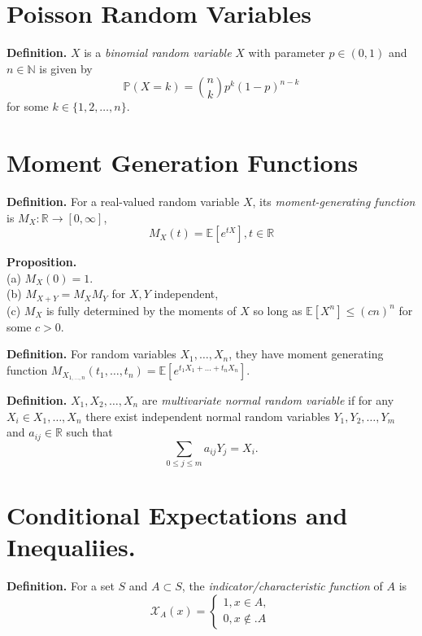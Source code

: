 \documentclass{article}[11pt]
\begin{document}
\section{Poisson Random Variables}

\textbf{Definition.} $X$ is a \emph{binomial random variable} $X$ with parameter $p \in (0,1)$ and $n \in \mathbb{N}$
is given by $$\mathbb{P}(X = k) = \binom{n}{k}p^k(1-p)^{n-k}$$ for some $k \in \{1,2,\dots, n\}.$
\section{Moment Generation Functions}

\textbf{Definition.} For a real-valued random variable $X$, its \emph{moment-generating function}
is $M_X: \mathbb{R}\to [0, \infty]$, $$M_X(t) = \mathbb{E}[e^{tX}], t \in \mathbb{R}$$

\par

\textbf{Proposition.} \\ 
(a) $M_X(0) = 1$. \\
(b) $M_{X+Y} = M_XM_Y$ for $X,Y$ independent, \\
(c) $M_X$ is fully determined by the moments of $X$ so long as 
$\mathbb{E}[X^n]\leq(cn)^n$ for some $c >0$.


\par
\textbf{Definition.} For random variables $X_1, \dots, X_n$, they have moment generating function
$M_{X_{1, \dots, n}}(t_1, \dots, t_n) = \mathbb{E}[e^{t_1X_1 + \dots + t_nX_n}].$

\par

\textbf{Definition.} $X_1, X_2, \dots, X_n$ are \emph{multivariate normal random variable} if for any $X_i \in {X_1, \dots, X_n}$
                     there exist independent normal random variables $Y_1, Y_2, \dots, Y_m$ and $a_{ij} \in \mathbb{R}$ such that
                     $$\sum_{0\leq j \leq m}a_{ij}Y_j = X_i.$$

 
\section{Conditional Expectations and Inequaliies.}

\textbf{Definition.} For a set $S$ and $A \subset S$, the \emph{indicator/characteristic function} of $A$ is 
\[
\mathcal{X}_A(x) = \begin{cases}
1, x \in A, \\
0, x \notin. A
\end{cases}
\]
\end{document}
